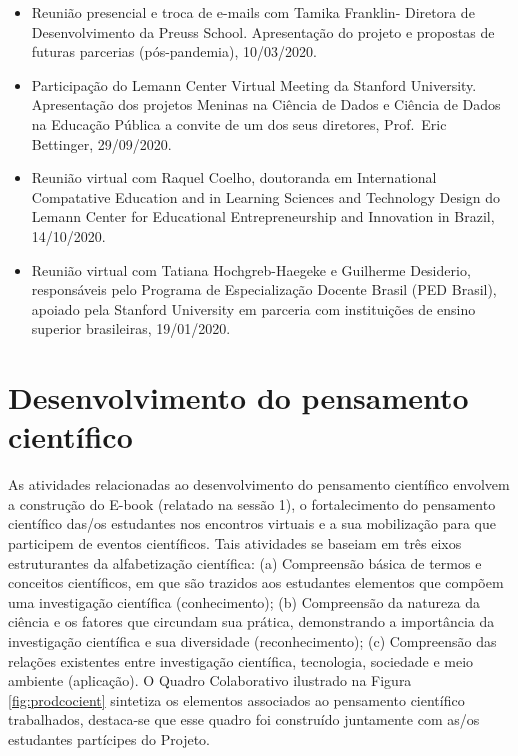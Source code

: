 \documentclass[
]{book}
\providecommand{\tightlist}{%
  \setlength{\itemsep}{0pt}\setlength{\parskip}{0pt}}
\begin{document}
\begin{itemize}
\tightlist
\item
  Reunião presencial e troca de e-mails com Tamika Franklin- Diretora de Desenvolvimento da Preuss School. Apresentação do projeto e propostas de futuras parcerias (pós-pandemia), 10/03/2020.
\item
  Participação do Lemann Center Virtual Meeting da Stanford University. Apresentação dos projetos Meninas na Ciência de Dados e Ciência de Dados na Educação Pública a convite de um dos seus diretores, Prof.~Eric Bettinger, 29/09/2020.
\item
  Reunião virtual com Raquel Coelho, doutoranda em International Compatative Education and in Learning Sciences and Technology Design do Lemann Center for Educational Entrepreneurship and Innovation in Brazil, 14/10/2020.
\item
  Reunião virtual com Tatiana Hochgreb-Haegeke e Guilherme Desiderio, responsáveis pelo Programa de Especialização Docente Brasil (PED Brasil), apoiado pela Stanford University em parceria com instituições de ensino superior brasileiras, 19/01/2020.
\end{itemize}

\hypertarget{desenvolvimento-do-pensamento-cientuxedfico}{%
\chapter{Desenvolvimento do pensamento científico}\label{desenvolvimento-do-pensamento-cientuxedfico}}

As atividades relacionadas ao desenvolvimento do pensamento científico envolvem a construção do E-book (relatado na sessão 1), o fortalecimento do pensamento científico das/os estudantes nos encontros virtuais e a sua mobilização para que participem de eventos científicos.
Tais atividades se baseiam em três eixos estruturantes da alfabetização científica: (a) Compreensão básica de termos e conceitos científicos, em que são trazidos aos estudantes elementos que compõem uma investigação científica (conhecimento); (b) Compreensão da natureza da ciência e os fatores que circundam sua prática, demonstrando a importância da investigação científica e sua diversidade (reconhecimento); (c) Compreensão das relações existentes entre investigação científica, tecnologia, sociedade e meio ambiente (aplicação).
O Quadro Colaborativo ilustrado na Figura \ref{fig:prodcocient} sintetiza os elementos associados ao pensamento científico trabalhados, destaca-se que esse quadro foi construído juntamente com as/os estudantes partícipes do Projeto.
\end{document}
